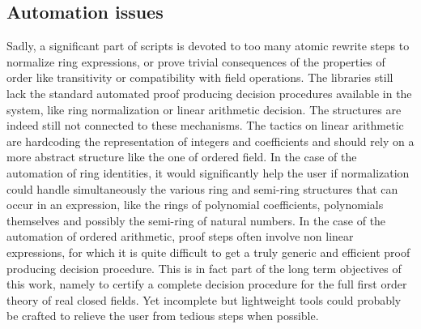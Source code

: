 \documentclass{mscs}
\begin{document}
\subsection{Automation issues}
Sadly, a significant part of scripts is devoted to too
many atomic rewrite steps to normalize ring expressions, or prove trivial
consequences of the properties of order like transitivity or
compatibility with field operations. The \ssr{} libraries still
lack the standard automated proof producing decision procedures
available in the \Coq{}
system, like ring normalization or linear arithmetic decision. The
\ssr{} structures are indeed still not connected to these
mechanisms. The \Coq{} tactics on linear arithmetic are hardcoding the
representation of integers and coefficients and should rely on a more
abstract structure like the one of ordered field. 
In the case of the automation of ring identities, it would significantly
help the user if normalization could handle simultaneously the various
ring and semi-ring structures that can occur in an expression, like
the rings of polynomial coefficients, polynomials themselves and
possibly the semi-ring of natural numbers.
In the case of the automation of ordered arithmetic, proof steps
often involve non linear expressions, for which it is quite difficult
to get a truly generic and efficient proof producing decision
procedure. This is in fact part of the long term objectives of this
work, namely to
certify a complete decision procedure for the full first order theory
of real closed fields. Yet incomplete but lightweight tools could
probably be crafted to relieve the user from tedious steps when
possible.
\end{document}
